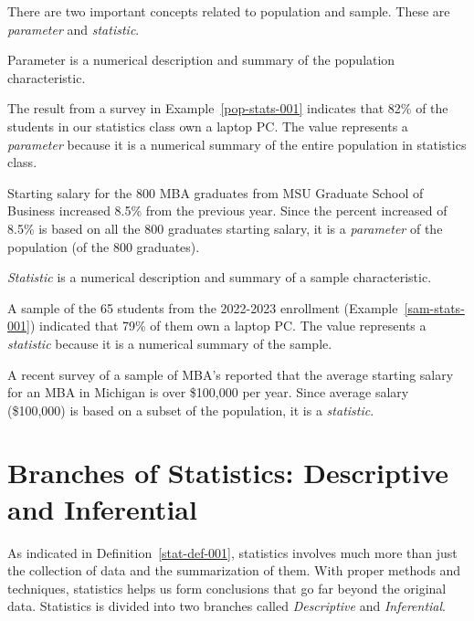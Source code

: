 There are two important concepts related to population and sample. These are {\it{parameter}} and {\it{statistic}}. 

\begin{definition} 
Parameter is a numerical description and summary of the population characteristic.  
\end{definition} 

\begin{example} 
The result from a survey in Example~\ref{pop-stats-001} indicates that 82\% of the students in our statistics class own a laptop PC. The value represents a {\it{parameter}} because it is a numerical summary of the entire population in statistics class. 
\end{example}

\begin{example}
Starting salary for the 800 MBA graduates from MSU Graduate School of Business increased 8.5\% from the previous year. Since the percent increased of 8.5\% is based on all the 800 graduates starting salary, it is a {\it{parameter}} of the population (of the 800 graduates). 
\end{example} 

\begin{definition} 
{\it{Statistic}} is a numerical description and summary of a sample characteristic.
\end{definition} 

\begin{example} 
A sample of the 65 students from the 2022-2023 enrollment (Example~\ref{sam-stats-001}) indicated that 79\% of them own a laptop PC. The value represents a {\it{statistic}} because it is a numerical summary of the sample. 
\end{example} 

\begin{example} \label{data-ex-last}
A recent survey of a sample of MBA's reported that the average starting salary for an MBA in Michigan is over \$100,000 per year. Since average salary (\$100,000) is based on a subset of the population, it is a {\it{statistic}}.
\end{example} 
 
\section{Branches of Statistics: Descriptive and Inferential}

As indicated in Definition~\ref{stat-def-001}, statistics involves much more than just the collection of data and the summarization of them. With proper methods and techniques, statistics helps us form conclusions that go far beyond the original data. Statistics is divided into two branches called {\it{Descriptive}} and {\it{Inferential}}.

